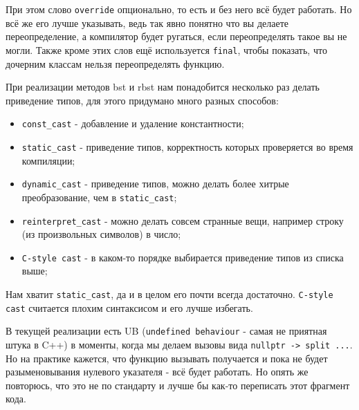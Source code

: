 При этом слово \texttt{override} опционально, то есть и без него всё будет работать. Но всё же его лучше указывать, ведь так явно понятно что вы делаете переопределение, а компилятор будет ругаться, если переопределять такое вы не могли. Также кроме этих слов ещё используется \texttt{final}, чтобы показать, что дочерним классам нельзя переопределять функцию.


При реализации методов bst и rbst нам понадобится несколько раз делать приведение типов, для этого придумано много разных способов:
\begin{itemize}
    \item \texttt{const_cast} - добавление и удаление константности;
    \item \texttt{static_cast} - приведение типов, корректность которых проверяется во время компиляции;
    \item \texttt{dynamic_cast} - приведение типов, можно делать более хитрые преобразование, чем в \texttt{static_cast};
    \item \texttt{reinterpret_cast} - можно делать совсем странные вещи, например строку (из произвольных символов) в число;
    \item \texttt{C-style cast} - в каком-то порядке выбирается приведение типов из списка выше;
\end{itemize}

Нам хватит \texttt{static_cast}, да и в целом его почти всегда достаточно. \texttt{C-style cast} считается плохим синтаксисом и его лучше избегать.


В текущей реализации есть UB (\texttt{undefined behaviour} - самая не приятная штука в C++) в моменты, когда мы делаем вызовы вида \texttt{nullptr -> split ...}. Но на практике кажется, что функцию вызывать получается и пока не будет разыменовывания нулевого указателя - всё будет работать. Но опять же повторюсь, что это не по стандарту и лучше бы как-то переписать этот фрагмент кода.
